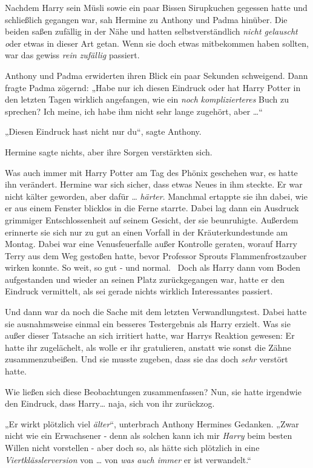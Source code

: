{Nachdem Harry sein Müsli sowie ein paar Bissen Sirupkuchen gegessen hatte und schließlich gegangen war, sah Hermine zu Anthony und Padma hinüber. Die beiden saßen zufällig in der Nähe und hatten selbstverständlich \emph{nicht gelauscht o}der etwas in dieser Art getan. Wenn sie doch etwas mitbekommen haben sollten, war das gewiss \emph{rein zufällig} passiert.

Anthony und Padma erwiderten ihren Blick ein paar Sekunden schweigend. Dann fragte Padma zögernd: „Habe nur ich diesen Eindruck oder hat Harry Potter in den letzten Tagen wirklich angefangen, wie ein \emph{noch} \emph{komplizierteres} Buch zu sprechen? Ich meine, ich habe ihm nicht sehr lange zugehört, aber …“ ~

„Diesen Eindruck hast nicht nur du“, sagte Anthony.

Hermine sagte nichts, aber ihre Sorgen verstärkten sich.

Was auch immer mit Harry Potter am Tag des Phönix geschehen war, es hatte ihn verändert. Hermine war sich sicher, dass etwas Neues in ihm steckte. Er war nicht kälter geworden, aber dafür … \emph{härter}. Manchmal ertappte sie ihn dabei, wie er aus einem Fenster blicklos in die Ferne starrte. Dabei lag dann ein Ausdruck grimmiger Entschlossenheit auf seinem Gesicht, der sie beunruhigte. Außerdem erinnerte sie sich nur zu gut an einen Vorfall in der Kräuterkundestunde am Montag. Dabei war eine Venusfeuerfalle außer Kontrolle geraten, worauf Harry Terry aus dem Weg gestoßen hatte, bevor Professor Sprouts Flammenfrostzauber wirken konnte. So weit, so gut - und normal. ~Doch als Harry dann vom Boden aufgestanden und wieder an seinen Platz zurückgegangen war, hatte er den Eindruck vermittelt, als sei gerade nichts wirklich Interessantes passiert.

Und dann war da noch die Sache mit dem letzten Verwandlungstest. Dabei hatte sie ausnahmsweise einmal ein besseres Testergebnis als Harry erzielt. Was sie außer dieser Tatsache an sich irritiert hatte, war Harrys Reaktion gewesen: Er hatte ihr zugelächelt, als wolle er ihr gratulieren, anstatt wie sonst die Zähne zusammenzubeißen. Und sie musste zugeben, dass sie das doch \emph{sehr} verstört hatte.

Wie ließen sich diese Beobachtungen zusammenfassen? Nun, sie hatte irgendwie den Eindruck, dass Harry… naja, sich von ihr zurückzog.

„Er wirkt plötzlich viel \emph{älter}“, unterbrach Anthony Hermines Gedanken. „Zwar nicht wie ein Erwachsener - denn als solchen kann ich mir \emph{Harry} beim besten Willen nicht vorstellen - aber doch so, als hätte sich plötzlich in eine \emph{Viertklässlerversion} von … von \emph{was auch immer} er ist verwandelt.“

}
